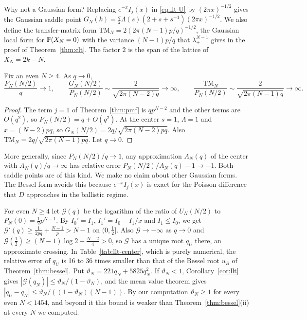 Why not a Gaussian form? Replacing $e^{-x}I_j(x)$ in \eqref{eq:llt-U} by
$(2\pi x)^{-1/2}$ gives the Gaussian saddle point
$G_N(k)=\frac q2\Lambda(s)(2+s+s^{-1})(2\pi x)^{-1/2}$. We also define the
transfer-matrix form $\mathrm{TM}_N=2(2\pi(N-1)p/q)^{-1/2}$, the Gaussian local
form for $\mathbb{P}(X_N=0)$ with the variance $(N-1)p/q$ that $\lambda_+^{N-1}$
gives in the proof of Theorem~\ref{thm:clt}. The factor $2$ is the span of the
lattice of $X_N=2k-N$.

\begin{proposition}\label{prop:llt-gauss}
Fix an even $N\ge4$. As $q\to0$,
\[
\frac{P_N(N/2)}q\to1,\qquad
\frac{G_N(N/2)}{P_N(N/2)}\sim\frac2{\sqrt{2\pi(N-2)q}}\to\infty,\qquad
\frac{\mathrm{TM}_N}{P_N(N/2)}\sim\frac2{\sqrt{2\pi(N-1)q}}\to\infty.
\]
\end{proposition}

\begin{proof}
The term $j=1$ of Theorem~\ref{thm:pmf} is $qp^{N-2}$ and the other terms are
$O(q^2)$, so $P_N(N/2)=q+O(q^2)$. At the center $s=1$, $\Lambda=1$ and
$x=(N-2)pq$, so $G_N(N/2)=2q/\sqrt{2\pi(N-2)pq}$. Also
$\mathrm{TM}_N=2q/\sqrt{2\pi(N-1)pq}$. Let $q\to0$.
\end{proof}

More generally, since $P_N(N/2)/q\to1$, any approximation $A_N(q)$ of the
center with $A_N(q)/q\to\infty$ has relative error $P_N(N/2)/A_N(q)-1\to-1$.
Both saddle points are of this kind. We make no claim about other Gaussian
forms. The Bessel form avoids this because $e^{-x}I_j(x)$ is exact for the
Poisson difference that $D$ approaches in the ballistic regime.

\begin{remark}\label{rem:llt-center}
For even $N\ge4$ let $\mathcal G(q)$ be the logarithm of the ratio of
$U_N(N/2)$ to $P_N(0)=\frac12p^{N-1}$. By $I_0'=I_1$, $I_1'=I_0-I_1/x$
\cite[Eqs.~10.29.2, 10.29.3]{dlmf} and $I_1\le I_0$, we get
$\mathcal G'(q)\ge\frac1{2pq}+\frac{N-1}p>N-1$ on $(0,\frac12]$. Also
$\mathcal G\to-\infty$ as $q\to0$ and
$\mathcal G(\frac12)\ge(N-1)\log2-\frac{N-2}4>0$, so $\mathcal G$ has a unique
root $q_U$ there, an approximate crossing. In Table~\ref{tab:llt-center},
which is purely numerical, the relative error of $q_U$ is 16 to 36 times
smaller than that of the Bessel root $u_B$ of Theorem~\ref{thm:bessel}. Put
$\vartheta_N=221q_N+5825q_N^2$. If $\vartheta_N<1$, Corollary~\ref{cor:llt}
gives $|\mathcal G(q_N)|\le\vartheta_N/(1-\vartheta_N)$, and the mean value
theorem gives $|q_U-q_N|\le\vartheta_N/((1-\vartheta_N)(N-1))$. By our
computation $\vartheta_N\ge1$ for every even $N<1454$, and beyond it this bound
is weaker than Theorem~\ref{thm:bessel}(ii) at every $N$ we computed.
\end{remark}

